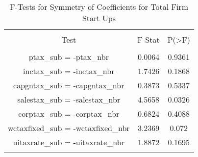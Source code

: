 
\begin{table}[!htbp] \centering 
  \caption{F-Tests for Symmetry of Coefficients for Total Firm Start Ups} 
  \label{--Ftests} 
\begin{tabular}{@{\extracolsep{5pt}} ccc} 
\\[-1.8ex]\hline 
\hline \\[-1.8ex] 
Test & F-Stat & P(\textgreater F) \\ 
\hline \\[-1.8ex] 
ptax\_sub = -ptax\_nbr & 0.0064 & 0.9361 \\ 
inctax\_sub = -inctax\_nbr & 1.7426 & 0.1868 \\ 
capgntax\_sub = -capgntax\_nbr & 0.3873 & 0.5337 \\ 
salestax\_sub = -salestax\_nbr & 4.5658 & 0.0326 \\ 
corptax\_sub = -corptax\_nbr & 0.6824 & 0.4088 \\ 
wctaxfixed\_sub = -wctaxfixed\_nbr & 3.2369 & 0.072 \\ 
uitaxrate\_sub = -uitaxrate\_nbr & 1.8872 & 0.1695 \\ 
\hline \\[-1.8ex] 
\end{tabular} 
\end{table} 
